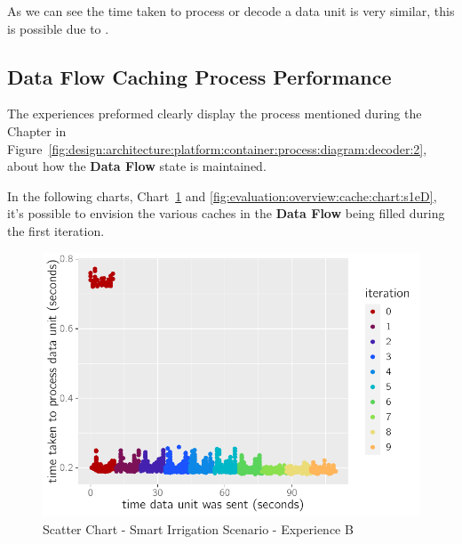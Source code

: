 As we can see the time taken to process or decode a data unit is very similar, this is possible due to .

\subsection{Data Flow Caching Process Performance}
\label{subsubsec:evaluation:overview:cache}

The experiences preformed clearly display the process mentioned during the  Chapter in Figure~\ref{fig:design:architecture:platform:container:process:diagram:decoder:2}, about how the \textbf{Data Flow} state is maintained.

In the following charts, Chart~\ref{fig:evaluation:overview:cache:chart:s2eB} and \ref{fig:evaluation:overview:cache:chart:s1eD}, it's possible to envision the various caches in the \textbf{Data Flow} being filled during the first iteration.

\begin{figure}[H]
    \centering
    \includegraphics[page=1]{assets/charts/s2eB.pdf}
    \caption[Scatter Chart - Smart Irrigation Scenario - Experience B]{Scatter Chart - Smart Irrigation Scenario - Experience B}
    \label{fig:evaluation:overview:cache:chart:s2eB}
 \end{figure}

